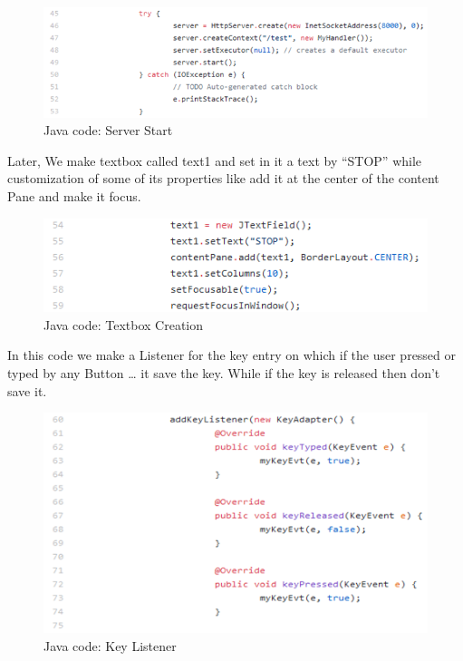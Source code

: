 \begin{figure}[h]
    \centering
    \includegraphics[width=1\textwidth]{figures/45.png}
    \caption{Java code: Server Start}
    \label{fig:my_label}
\end{figure}

\newpage

Later, We make textbox called text1 and set in it a text by “STOP” while customization of some of its properties like add it at the center of the content Pane and make it focus.

\begin{figure}[h]
    \centering
    \includegraphics{figures/46.png}
    \caption{Java code: Textbox Creation}
    \label{fig:my_label}
\end{figure}

In this code we make a Listener for the key entry on which if the user pressed or typed by any Button … it save the key. While if the key is released then don’t save it.

\begin{figure}[h]
    \centering
    \includegraphics{figures/47.png}
    \caption{Java code: Key Listener}
    \label{fig:my_label}
\end{figure}

